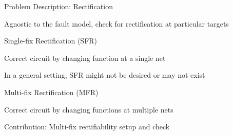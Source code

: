 \begin{frame}{\large Problem Description: Rectification}
\bi 
	\item Agnostic to the fault model, check for rectification at particular targets
	\bi
	\pause
		\item Single-fix Rectification (SFR)
		\bi
			\item Correct circuit by changing function at a single net
		\ei
	\ei
	\pause
	\vspace{0.1in}
	\vspace{0.1in}
	\vspace{0.1in}
	\item In a general setting, SFR might not be desired or may not exist
	\bi
	\pause
	\item Multi-fix Rectification (MFR)
	\bi
		\item Correct circuit by changing functions at multiple nets
		\item Contribution: Multi-fix rectifiability setup and check
	\ei
	\ei
\ei
\end{frame}




